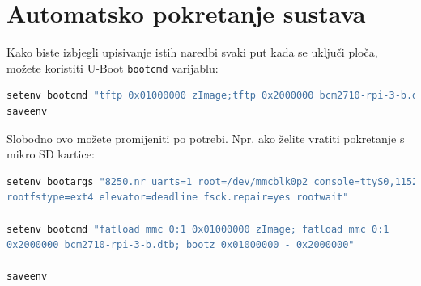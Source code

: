 \documentclass[11pt]{article}
\begin{document}
\section{Automatsko pokretanje sustava}
Kako biste izbjegli upisivanje istih naredbi svaki put kada se uključi ploča,
 možete koristiti U-Boot \texttt{bootcmd} varijablu:
\begin{lstlisting}[language=bash,escapechar=\%]
setenv bootcmd "tftp 0x01000000 zImage;tftp 0x2000000 bcm2710-rpi-3-b.dtb;%\newline%bootz 0x01000000 - 0x2000000"
saveenv
\end{lstlisting}
Slobodno ovo možete promijeniti po potrebi. Npr. ako želite vratiti pokretanje
 s mikro SD kartice:
\begin{lstlisting}[language=bash]
setenv bootargs "8250.nr_uarts=1 root=/dev/mmcblk0p2 console=ttyS0,115200
rootfstype=ext4 elevator=deadline fsck.repair=yes rootwait"

setenv bootcmd "fatload mmc 0:1 0x01000000 zImage; fatload mmc 0:1
0x2000000 bcm2710-rpi-3-b.dtb; bootz 0x01000000 - 0x2000000"

saveenv
\end{lstlisting}
\end{document}
